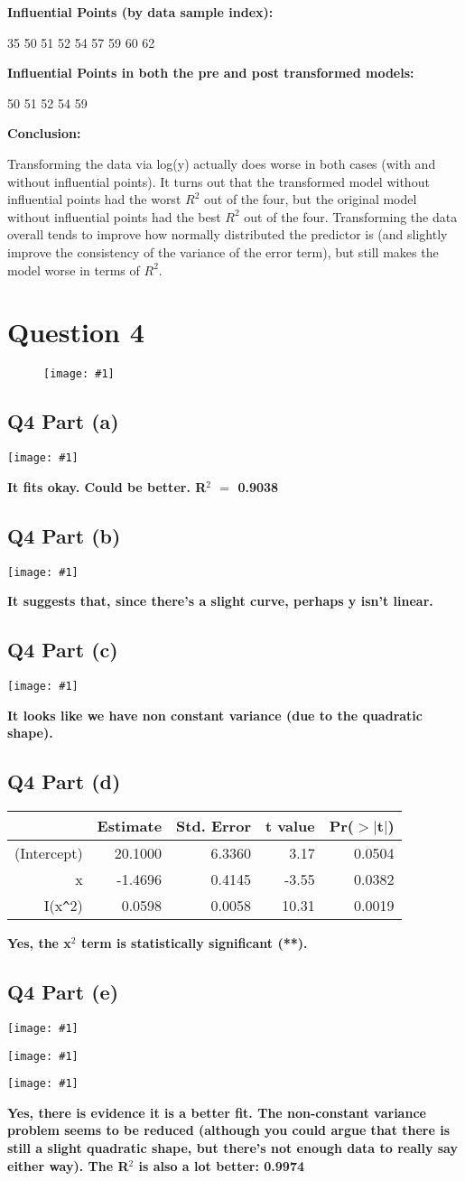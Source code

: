 \documentclass{article}
\newcommand{\mt}[1]{\ensuremath{#1}}
\newcommand\bsc[2][\DefaultOpt]{%
  \def\DefaultOpt{#2}%
  \section[#1]{#2}%
}
\newcommand\ssc[2][\DefaultOpt]{%
  \def\DefaultOpt{#2}%
  \subsection[#1]{#2}%
}
\newcommand{\eql}{ \mt{\operatorname{=}} }
\newcommand{\simg}[1]{
  \texttt{[image: \#1]}
}
\newcommand{\wimg}[1]{
\begin{figure}[h]
  \texttt{[image: \#1]}
\end{figure}
}
\begin{document}
{{\textbf{Influential Points (by data sample index):}

35 50 51 52 54 57 59 60 62

\textbf{Influential Points in both the pre and post transformed models:}

50 51 52 54 59

\textbf{Conclusion:}

Transforming the data via log(y) actually does worse in both cases (with and without influential points). It turns out that the transformed model without influential points had the worst $R^2$ out of the four, but the original model without influential points had the best $R^2$ out of the four. Transforming the data overall tends to improve how normally distributed the predictor is (and slightly improve the consistency of the variance of the error term), but still makes the model worse in terms of $R^2$.

}
}

\newpage

\bsc{Question 4}{
\wimg{HW6Q4}

\ssc{Q4 Part (a)}{

\simg{HW6Q4LM}

\textbf{It fits okay. Could be better. R$^2$ \eql 0.9038}

}
\ssc{Q4 Part (b)}{

\simg{HW6Q4PB}

\textbf{It suggests that, since there's a slight curve, perhaps y isn't linear.}

}
\ssc{Q4 Part (c)}{

\simg{HW6Q4PC}

\textbf{It looks like we have non constant variance (due to the quadratic shape).}
}
\ssc{Q4 Part (d)}{

\begin{table}[ht]
\centering
\begin{tabular}{rrrrr}
  \hline
 & Estimate & Std. Error & t value & Pr($>$$|$t$|$) \\ 
  \hline
(Intercept) & 20.1000 & 6.3360 & 3.17 & 0.0504 \\ 
  x & -1.4696 & 0.4145 & -3.55 & 0.0382 \\ 
  I(x\verb|^|2) & 0.0598 & 0.0058 & 10.31 & 0.0019 \\ 
   \hline
\end{tabular}
\end{table}

\textbf{Yes, the x$^2$ term is statistically significant (**).}

}
\ssc{Q4 Part (e)}{

\simg{HW6Q4PE1}
\simg{HW6Q4PE2}
\simg{HW6Q4PE3}

\textbf{Yes, there is evidence it is a better fit. The non-constant variance problem seems to be reduced (although you could argue that there is still a slight quadratic shape, but there's not enough data to really say either way). The R$^2$ is also a lot better: 0.9974} 

}
}
\end{document}
